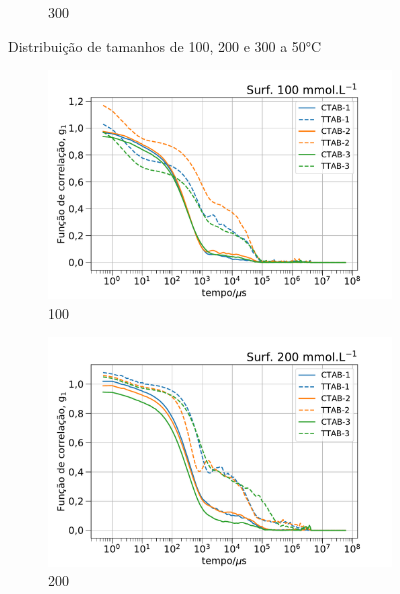 \begin{figure}[h]
\begin{subfigure}{0.3\textwidth}
		\caption{300\mM}
		\label{fig:DLS_300_distrib}
	\end{subfigure}
	\caption{Distribuição de tamanhos de \CTTAB{} 100, 200 e 300 \mM{} a 50°C}
	\label{fig:DLS_distrib_conc}
\end{figure}

\begin{figure}[h]
	\begin{subfigure}{0.3\textwidth}
		\centering
		\includegraphics[width=\textwidth]{imagens/dls/100_CC}
		\caption{100 \mM}
		\label{fig:DLS_100_CC}
	\end{subfigure} %
	\begin{subfigure}{0.3\textwidth}
		\centering
		\includegraphics[width=\textwidth]{imagens/dls/200_CC}
		\caption{200 \mM}
		\label{fig:DLS_200_CC}
	\end{subfigure} %
	\begin{subfigure}{0.3\textwidth}

\end{subfigure}
\end{figure}
